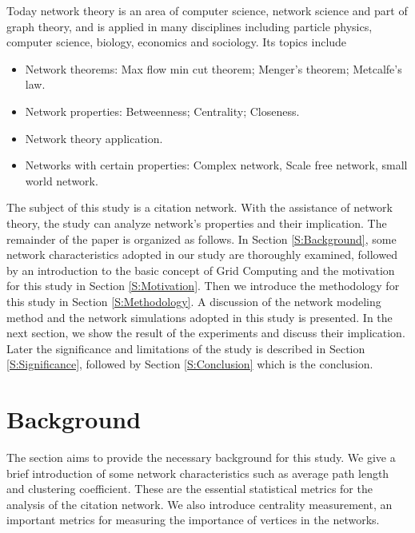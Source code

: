 Today network theory  is an area of computer science, network science and part of graph theory, and is applied in many disciplines including particle physics, computer science, biology, economics and sociology. Its topics include

\begin {itemize}
\item Network theorems: Max flow min cut theorem; Menger's theorem; Metcalfe's law.
\item Network properties: Betweenness; Centrality; Closeness.
\item Network theory application.
\item Networks with certain properties: Complex network, Scale free network, small world network. 
\end {itemize}

The subject of this study is a citation network. With the assistance of network theory, the study can analyze network's properties and their implication. The remainder of the paper is organized as follows. In Section \ref{S:Background}, some network characteristics adopted in our study are thoroughly examined, followed by an introduction to the basic concept of Grid Computing and the motivation for this study in Section \ref{S:Motivation}. Then we introduce the methodology for this study in Section \ref{S:Methodology}. A discussion of the network modeling method and the network simulations adopted in this study is presented.  In the next section, we show the result of the experiments and discuss their implication.  Later the significance and limitations of the study is described in Section \ref{S:Significance}, followed by Section \ref{S:Conclusion} which is the conclusion. 

\section{Background \label{S:Background} }
The section aims to provide the necessary background for this study. We give a brief introduction of  some network characteristics such as average path length and clustering coefficient. These are the essential statistical metrics for the analysis of the citation network.  We also introduce centrality measurement, an important metrics for measuring the importance of vertices in the networks.

